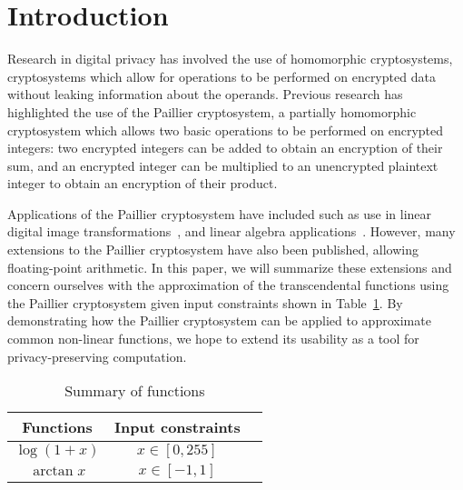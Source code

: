 \section{Introduction}
Research in digital privacy has involved the use of homomorphic cryptosystems, cryptosystems which allow for operations to be performed on encrypted data without leaking information about the operands.
Previous research has highlighted the use of the Paillier cryptosystem, a partially homomorphic cryptosystem which allows two basic operations to be performed on encrypted integers: two encrypted integers can be added to obtain an encryption of their sum, and an encrypted integer can be multiplied to an unencrypted plaintext integer to obtain an encryption of their product.

Applications of the Paillier cryptosystem have included such as use in linear digital image transformations~\cite{ziad_cryptoimg:_2016}, and linear algebra applications~\cite{hutchison_privacy-preserving_2009}. However, many extensions to the Paillier cryptosystem have also been published, allowing floating-point arithmetic. In this paper, we will summarize these extensions and concern ourselves with the approximation of the transcendental functions using the Paillier cryptosystem given input constraints shown in Table~\ref{tab:inputconstraints}. By demonstrating how the Paillier cryptosystem can be applied to approximate common non-linear functions, we hope to extend its usability as a tool for privacy-preserving computation.
\begin{table}
	\caption{Summary of functions}
	\label{tab:inputconstraints}
	\begin{tabular}{ccl}
		\toprule
		Functions & Input constraints\\
		\midrule
		$\log(1+x)$ & $x\in[0,255]$\\
		$\arctan x$ & $x\in[-1,1]$\\
	    \bottomrule
    \end{tabular}
\end{table}
